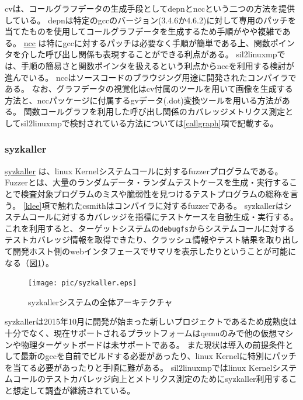 \par
\acrshort{cv}は、コールグラフデータの生成手段としてdepnとnccという二つの方法を提供している。
depnは特定の\acrshort{gcc}のバージョン(3.4.6か4.6.2)に対して専用のパッチを当てたものを使用してコールグラフデータを生成するため手順がやや複雑である。
\href{http://students.ceid.upatras.gr/~sxanth/ncc/}{ncc} \cite{ncc}は特に\acrshort{gcc}に対するパッチは必要なく手順が簡単である上、関数ポインタを介した呼び出し関係も表現することができる利点がある。
\acrshort{sil2linuxmp}では、手順の簡易さと関数ポインタを扱えるという利点からnccを利用する検討が進んでいる。
nccはソースコードのブラウジング用途に開発されたコンパイラである。
なお、グラフデータの視覚化は\acrshort{cv}付属のツールを用いて画像を生成する方法と、nccパッケージに付属する\acrshort{gv}データ(.dot)変換ツールを用いる方法がある。
関数コールグラフを利用した呼び出し関係のカバレッジメトリクス測定として\acrshort{sil2linuxmp}で検討されている方法については\ref{callgraph}項で記載する。
\newpage
\subsubsection{syzkaller}
\href{https://github.com/google/syzkaller}{\acrshort{syzkaller}} \cite{syzkaller}は、\acrshort{linux} Kernelシステムコールに対する\acrshort{fuzzer}プログラムである。
Fuzzerとは、大量のランダムデータ・ランダムテストケースを生成・実行することで検査対象プログラムのミスや脆弱性を見つけるテストプログラムの総称を言う。
\ref{klee}項で触れた\acrshort{csmith}はコンパイラに対する\acrshort{fuzzer}である。
\acrshort{syzkaller}はシステムコールに対するカバレッジを指標にテストケースを自動生成・実行する。
これを利用すると、ターゲットシステムの\verb|debugfs|からシステムコールに対するテストカバレッジ情報を取得できたり、クラッシュ情報やテスト結果を取り出して開発ホスト側のwebインタフェースでサマリを表示したりということが可能になる（図\ref{syzkaller}）。
\begin{figure}[ht]
  \centering
  \texttt{[image: pic/syzkaller.eps]}
  \caption{\acrshort{syzkaller}システムの全体アーキテクチャ}
  \label{syzkaller}
\end{figure}
\par
\acrshort{syzkaller}は2015年10月に開発が始まった新しいプロジェクトであるため成熟度は十分でなく、現在サポートされるプラットフォームは\acrshort{qemu}のみで他の仮想マシンや物理ターゲットボードは未サポートである。
また現状は導入の前提条件として最新の\acrshort{gcc}を自前でビルドする必要があったり、\acrshort{linux} Kernelに特別にパッチを当てる必要があったりと手順に難がある。
\acrshort{sil2linuxmp}では\acrshort{linux} Kernelシステムコールのテストカバレッジ向上とメトリクス測定のために\acrshort{syzkaller}利用すること想定して調査が継続されている。
